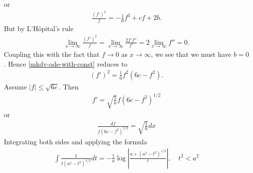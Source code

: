 \documentclass[12pt,reqno]{amsart}
\numberwithin{equation}{section}  %
\begin{document}
        or
        \begin{equation*}
        \begin{split}
          \frac{(f')^{2}}{f} = -\frac{1}{6}f^{3} + cf + 2b.
        \end{split}
        \end{equation*}
        But by L'H{\^o}pital's rule
        \begin{equation*}
        \begin{split}
          \lim_{x \to \infty} \frac{(f')^{2}}{f} = \lim_{x \to \infty} \frac{2
          f' f''}{f'} = 2 \lim_{x \to \infty} f'' = 0.
        \end{split}
        \end{equation*}
        Coupling this with the fact that $f \to 0$ as $x \to \infty$, we see
        that we must have $b = 0$. Hence \eqref{mkdv-ode-with-const} reduces to
        \begin{equation*}
        \begin{split}
          (f')^{2} = \frac{1}{6}f^{2}(6c - f^{2}).
        \end{split}
        \end{equation*}
        Assume $| f | \le \sqrt{6c}$. Then
        \begin{equation*}
        \begin{split}
          f' = \sqrt{\frac{1}{6}} f \left( 6c - f^{2} \right)^{1/2}
        \end{split}
        \end{equation*}
        or
        \begin{equation*}
        \begin{split}
          \frac{df}{f\left( 6c - f^{2} \right)^{1/2}} = \sqrt{\frac{1}{6}}dx
        \end{split}
        \end{equation*}
        Integrating both sides and applying the formula
        \begin{equation*}
        \begin{split}
          \int \frac{1}{t(a^{2} - t^{2})^{1/2}}dt = -\frac{1}{a} \log | \frac{a
          + (a^{2}-t^{2})^{1/2}}{t}
          |, \quad t^{2} < a^{2}
        \end{split}
        \end{equation*}
\end{document}
